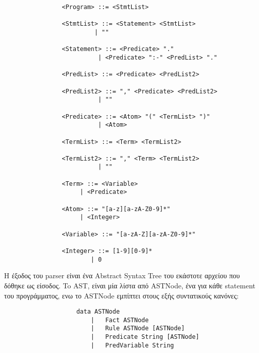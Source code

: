 \documentclass[10pt]{article}
\begin{document}
\begin{verbatim}
                <Program> ::= <StmtList>

                <StmtList> ::= <Statement> <StmtList>
                         | ""
                                  
                <Statement> ::= <Predicate> "."
                          | <Predicate> ":-" <PredList> "."
                           
                <PredList> ::= <Predicate> <PredList2>

                <PredList2> ::= "," <Predicate> <PredList2>
                          | ""
                     
                <Predicate> ::= <Atom> "(" <TermList> ")"
                          | <Atom>
                        
                <TermList> ::= <Term> <TermList2>

                <TermList2> ::= "," <Term> <TermList2>
                          | ""
                        
                <Term> ::= <Variable>
                     | <Predicate>
                    
                <Atom> ::= "[a-z][a-zA-Z0-9]*"
                     | <Integer>

                <Variable> ::= "[a-zA-Z][a-zA-Z0-9]*"

                <Integer> ::= [1-9][0-9]*
                        | 0
\end{verbatim}





H έξοδος του parser είναι ένα Abstract Syntax Tree του εκάστοτε αρχείου που δόθηκε ως είσοδος. To AST, είναι μία λίστα από ASTNode, ένα για κάθε statement του προγράμματος, ενω το ASTNode εμπίπτει στους εξής συντατικούς κανόνες:
\begin{verbatim}
                    data ASTNode
                        |   Fact ASTNode
                        |   Rule ASTNode [ASTNode]
                        |   Predicate String [ASTNode]
                        |   PredVariable String
\end{verbatim}
\end{document}
